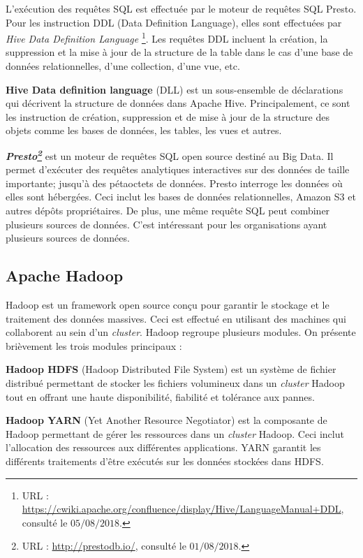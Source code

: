L'exécution des requêtes SQL est effectuée par le moteur de requêtes SQL Presto. Pour les instruction DDL (Data Definition Language), elles sont effectuées par  \textit{Hive Data Definition Language} \footnote{URL : \url{https://cwiki.apache.org/confluence/display/Hive/LanguageManual+DDL}, consulté le $05/08/2018$.}. Les requêtes DDL incluent la création, la suppression et la mise à jour de la structure de la table dans le cas d'une base de données relationnelles, d'une collection, d'une vue, etc. 

\begin{tcolorbox}
	\textbf{Hive Data definition language} (DLL) est un sous-ensemble de déclarations qui décrivent la structure de données dans Apache Hive.  Principalement, ce sont les instruction de création, suppression et de mise à jour de la structure des objets comme les bases de données, les tables, les vues et autres.
\end{tcolorbox}

\begin{tcolorbox}
	\textbf{\textit{Presto\footnote{URL : \url{http://prestodb.io/}, consulté le $01/08/2018$.} }} est un moteur de requêtes SQL open source destiné au Big Data. Il permet d'exécuter des requêtes analytiques interactives sur des données de taille importante; jusqu'à des pétaoctets de données.
	Presto interroge les données où elles sont hébergées. Ceci inclut les bases de données relationnelles, Amazon S3 et autres dépôts propriétaires. De plus, une même requête SQL peut combiner plusieurs sources de données. C'est intéressant pour les organisations ayant plusieurs sources de données.%
\end{tcolorbox} 


\subsection{Apache Hadoop}

Hadoop est un framework open source conçu pour garantir le stockage et le traitement des données massives. Ceci est effectué  en utilisant des machines  qui collaborent  au sein d'un \textit{cluster}. Hadoop regroupe plusieurs modules.  On présente brièvement les trois modules principaux :   \par 
\textbf{Hadoop HDFS}  (Hadoop Distributed File System) est un système de fichier distribué permettant de stocker les fichiers volumineux dans un \textit{cluster} Hadoop  tout en  offrant une haute disponibilité, fiabilité et tolérance aux pannes.\par
\textbf{Hadoop YARN} (Yet Another Resource Negotiator) est la composante  de Hadoop permettant de  gérer les ressources dans un \textit{cluster} Hadoop. Ceci inclut l'allocation des ressources aux différentes applications.  YARN  garantit les différents traitements d'être exécutés sur les données stockées dans HDFS.\par

